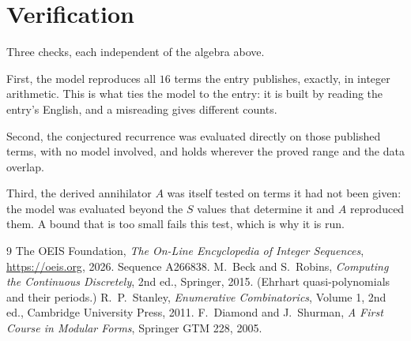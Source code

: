 \documentclass[11pt,a4paper]{article}
\theoremstyle{plain}
\theoremstyle{definition}
\begin{document}
\section{Verification}

Three checks, each independent of the algebra above.

First, the model reproduces all $16$ terms the entry publishes, exactly, in integer
arithmetic. This is what ties the model to the entry: it is built by reading the entry's
English, and a misreading gives different counts.

Second, the conjectured recurrence was evaluated directly on those published terms, with no
model involved, and holds wherever the proved range and the data overlap.

Third, the derived annihilator $A$ was itself tested on terms it had not been given: the model
was evaluated beyond the $S$ values that determine it and $A$ reproduced them. A bound that is
too small fails this test, which is why it is run.

\begin{thebibliography}{9}
 The OEIS Foundation, \emph{The On-Line Encyclopedia of Integer
Sequences}, \url{https://oeis.org}, 2026. Sequence A266838.
 M.~Beck and S.~Robins, \emph{Computing the Continuous Discretely},
2nd ed., Springer, 2015. (Ehrhart quasi-polynomials and their periods.)
 R.~P.~Stanley, \emph{Enumerative Combinatorics}, Volume 1, 2nd ed.,
Cambridge University Press, 2011.
 F.~Diamond and J.~Shurman, \emph{A First Course in Modular Forms},
Springer GTM 228, 2005.
\end{thebibliography}
\end{document}
